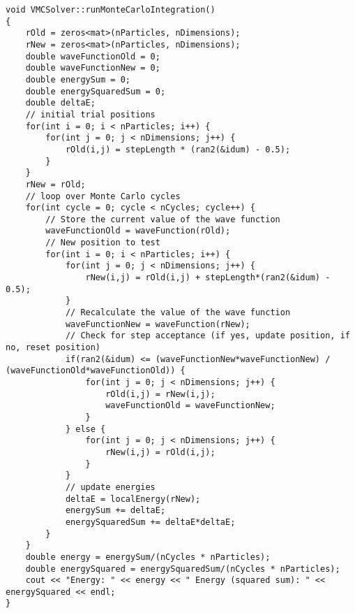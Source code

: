 \documentclass[%
twoside,                 %
final,                   %
10pt]{article}
\begin{document}
\begin{verbatim}
void VMCSolver::runMonteCarloIntegration()
{
    rOld = zeros<mat>(nParticles, nDimensions);
    rNew = zeros<mat>(nParticles, nDimensions);
    double waveFunctionOld = 0;
    double waveFunctionNew = 0;
    double energySum = 0;
    double energySquaredSum = 0;
    double deltaE;
    // initial trial positions
    for(int i = 0; i < nParticles; i++) {
        for(int j = 0; j < nDimensions; j++) {
            rOld(i,j) = stepLength * (ran2(&idum) - 0.5);
        }
    }
    rNew = rOld;
    // loop over Monte Carlo cycles
    for(int cycle = 0; cycle < nCycles; cycle++) {
        // Store the current value of the wave function
        waveFunctionOld = waveFunction(rOld);
        // New position to test
        for(int i = 0; i < nParticles; i++) {
            for(int j = 0; j < nDimensions; j++) {
                rNew(i,j) = rOld(i,j) + stepLength*(ran2(&idum) - 0.5);
            }
            // Recalculate the value of the wave function
            waveFunctionNew = waveFunction(rNew);
            // Check for step acceptance (if yes, update position, if no, reset position)
            if(ran2(&idum) <= (waveFunctionNew*waveFunctionNew) / (waveFunctionOld*waveFunctionOld)) {
                for(int j = 0; j < nDimensions; j++) {
                    rOld(i,j) = rNew(i,j);
                    waveFunctionOld = waveFunctionNew;
                }
            } else {
                for(int j = 0; j < nDimensions; j++) {
                    rNew(i,j) = rOld(i,j);
                }
            }
            // update energies
            deltaE = localEnergy(rNew);
            energySum += deltaE;
            energySquaredSum += deltaE*deltaE;
        }
    }
    double energy = energySum/(nCycles * nParticles);
    double energySquared = energySquaredSum/(nCycles * nParticles);
    cout << "Energy: " << energy << " Energy (squared sum): " << energySquared << endl;
}


\end{verbatim}
\end{document}
